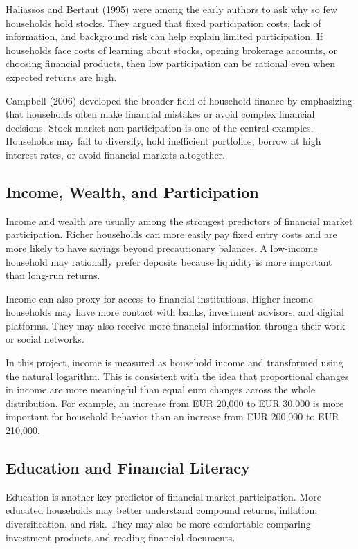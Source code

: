 \documentclass[12pt]{article}
\begin{document}
Haliassos and Bertaut (1995) were among the early authors to ask why so few households hold stocks. They argued that fixed participation costs, lack of information, and background risk can help explain limited participation. If households face costs of learning about stocks, opening brokerage accounts, or choosing financial products, then low participation can be rational even when expected returns are high.

Campbell (2006) developed the broader field of household finance by emphasizing that households often make financial mistakes or avoid complex financial decisions. Stock market non-participation is one of the central examples. Households may fail to diversify, hold inefficient portfolios, borrow at high interest rates, or avoid financial markets altogether.

\subsection{Income, Wealth, and Participation}

Income and wealth are usually among the strongest predictors of financial market participation. Richer households can more easily pay fixed entry costs and are more likely to have savings beyond precautionary balances. A low-income household may rationally prefer deposits because liquidity is more important than long-run returns.

Income can also proxy for access to financial institutions. Higher-income households may have more contact with banks, investment advisors, and digital platforms. They may also receive more financial information through their work or social networks.

In this project, income is measured as household income and transformed using the natural logarithm. This is consistent with the idea that proportional changes in income are more meaningful than equal euro changes across the whole distribution. For example, an increase from EUR 20,000 to EUR 30,000 is more important for household behavior than an increase from EUR 200,000 to EUR 210,000.

\subsection{Education and Financial Literacy}

Education is another key predictor of financial market participation. More educated households may better understand compound returns, inflation, diversification, and risk. They may also be more comfortable comparing investment products and reading financial documents.
\end{document}
